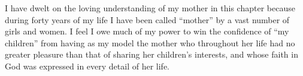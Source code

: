 I have dwelt on the loving understanding of my mother
in this chapter because during forty years of my life I
have been called “mother” by a vast number of girls
and women. I feel I owe much of my power to win the
confidence of “my children” from having as my model
the mother who throughout her life had no greater
pleasure than that of sharing her children’s interests, and
whose faith in God was expressed in every detail of her
life.
